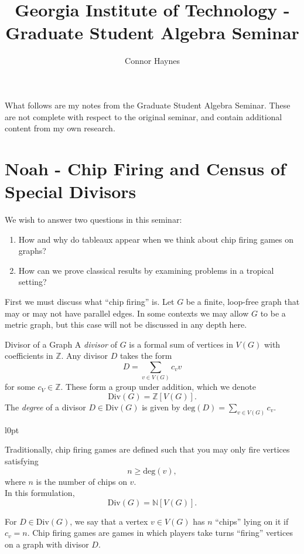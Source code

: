 \documentclass[10pt]{article}
\title{Georgia Institute of Technology - Graduate Student Algebra Seminar}
\author{Connor Haynes}
\date{}
\begin{document}
\maketitle
What follows are my notes from the Graduate Student Algebra Seminar. These are not complete with respect to the original seminar, and contain additional content from my own research.
\section{Noah - Chip Firing and Census of Special Divisors}
We wish to answer two questions in this seminar:
\begin{enumerate}
\item How and why do tableaux appear when we think about chip firing games on graphs?
\item How can we prove classical results by examining problems in a tropical setting?
\end{enumerate}

First we must discuss what ``chip firing'' is. Let $G$ be a finite, loop-free graph that may or may not have parallel edges. In some contexts we may allow $G$ to be a metric graph, but this case will not be discussed in any depth here.

\begin{boxDef}{Divisor of a Graph}
  A \emph{divisor} of $G$ is a formal sum of vertices in $V(G)$ with coefficients in $\mathbb{Z}$. Any divisor $D$ takes the form
  \[D=\sum_{v\in V(G)}c_vv\]
  for some $c_V\in\mathbb{Z}$. These form a group under addition, which we denote
  \[\text{Div}(G)=\mathbb{Z}[V(G)].\]
  The \emph{degree} of a divisor $D\in\text{Div}(G)$ is given by $\text{deg}(D)=\sum_{v\in V(G)}c_v$.
\end{boxDef}

\begin{wrapfigure}{l}{0pt}
  \begin{boxNote}[width=5cm]{}
  Traditionally, chip firing games are defined such that you may only fire vertices satisfying
  \[n\geq\text{deg}(v),\]
  where $n$ is the number of chips on $v$.\\

  In this formulation,
  \[\text{Div}(G)=\mathbb{N}[V(G)].\]
  \end{boxNote}
\end{wrapfigure}

For $D\in\text{Div}(G)$, we say that a vertex $v\in V(G)$ has $n$ ``chips'' lying on it if $c_v=n$. Chip firing games are games in which players take turns ``firing'' vertices on a graph with divisor $D$.\\
\end{document}
